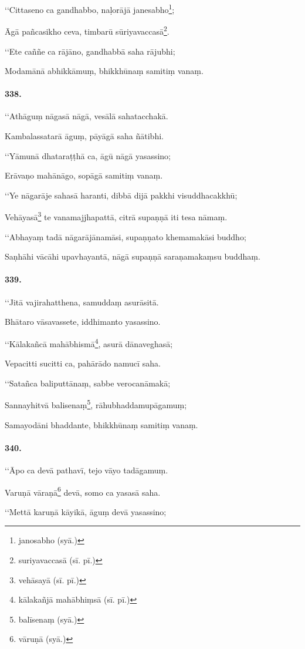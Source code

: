 ‘‘Cittaseno ca gandhabbo, naḷorājā janesabho\footnote{janosabho (syā.)};

Āgā pañcasikho ceva, timbarū sūriyavaccasā\footnote{suriyavaccasā (sī. pī.)}.

‘‘Ete caññe ca rājāno, gandhabbā saha rājubhi;

Modamānā abhikkāmuṃ, bhikkhūnaṃ samitiṃ vanaṃ.

\paragraph{338.}‘‘Athāguṃ nāgasā nāgā, vesālā sahatacchakā.

Kambalassatarā āguṃ, pāyāgā saha ñātibhi.

‘‘Yāmunā dhataraṭṭhā ca, āgū nāgā yasassino;

Erāvaṇo mahānāgo, sopāgā samitiṃ vanaṃ.

‘‘Ye nāgarāje sahasā haranti, dibbā dijā pakkhi visuddhacakkhū;

Vehāyasā\footnote{vehāsayā (sī. pī.)} te vanamajjhapattā, citrā supaṇṇā iti tesa nāmaṃ.

‘‘Abhayaṃ tadā nāgarājānamāsi, supaṇṇato khemamakāsi buddho;

Saṇhāhi vācāhi upavhayantā, nāgā supaṇṇā saraṇamakaṃsu buddhaṃ.

\paragraph{339.}‘‘Jitā vajirahatthena, samuddaṃ asurāsitā.

Bhātaro vāsavassete, iddhimanto yasassino.

‘‘Kālakañcā mahābhismā\footnote{kālakañjā mahābhiṃsā (sī. pī.)}, asurā dānaveghasā;

Vepacitti sucitti ca, pahārādo namucī saha.

‘‘Satañca baliputtānaṃ, sabbe verocanāmakā;

Sannayhitvā balisenaṃ\footnote{balīsenaṃ (syā.)}, rāhubhaddamupāgamuṃ;

Samayodāni bhaddante, bhikkhūnaṃ samitiṃ vanaṃ.

\paragraph{340.}‘‘Āpo ca devā pathavī, tejo vāyo tadāgamuṃ.

Varuṇā vāraṇā\footnote{vāruṇā (syā.)} devā, somo ca yasasā saha.

‘‘Mettā karuṇā kāyikā, āguṃ devā yasassino;

